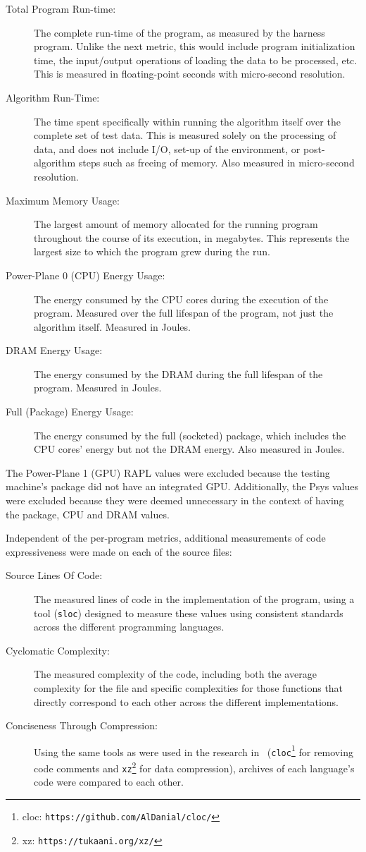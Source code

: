 \begin{description}
\item[Total Program Run-time:] The complete run-time of the program, as measured by the harness program. Unlike the next metric, this would include program initialization time, the input/output operations of loading the data to be processed, etc. This is measured in floating-point seconds with micro-second resolution.
\item[Algorithm Run-Time:] The time spent specifically within running the algorithm itself over the complete set of test data. This is measured solely on the processing of data, and does not include I/O, set-up of the environment, or post-algorithm steps such as freeing of memory. Also measured in micro-second resolution.
\item[Maximum Memory Usage:] The largest amount of memory allocated for the running program throughout the course of its execution, in megabytes. This represents the largest size to which the program grew during the run.
\item[Power-Plane 0 (CPU) Energy Usage:] The energy consumed by the CPU cores during the execution of the program. Measured over the full lifespan of the program, not just the algorithm itself. Measured in Joules.
\item[DRAM Energy Usage:] The energy consumed by the DRAM during the full lifespan of the program. Measured in Joules.
\item[Full (Package) Energy Usage:] The energy consumed by the full (socketed) package, which includes the CPU cores' energy but not the DRAM energy. Also measured in Joules.
\end{description}

The Power-Plane 1 (GPU) RAPL values were excluded because the testing machine's package did not have an integrated GPU. Additionally, the Psys values were excluded because they were deemed unnecessary in the context of having the package, CPU and DRAM values.

Independent of the per-program metrics, additional measurements of code expressiveness were made on each of the source files:

\begin{description}
\item[Source Lines Of Code:] The measured lines of code in the implementation of the program, using a tool (\texttt{sloc}) designed to measure these values using consistent standards across the different programming languages.
\item[Cyclomatic Complexity:] The measured complexity of the code, including both the average complexity for the file and specific complexities for those functions that directly correspond to each other across the different implementations.
\item[Conciseness Through Compression:] Using the same tools as were used in the research in~\cite{bergmans} (\texttt{cloc}\footnote{cloc: \texttt{https://github.com/AlDanial/cloc/}} for removing code comments and \texttt{xz}\footnote{xz: \texttt{https://tukaani.org/xz/}} for data compression), archives of each language's code were compared to each other.
\end{description}

